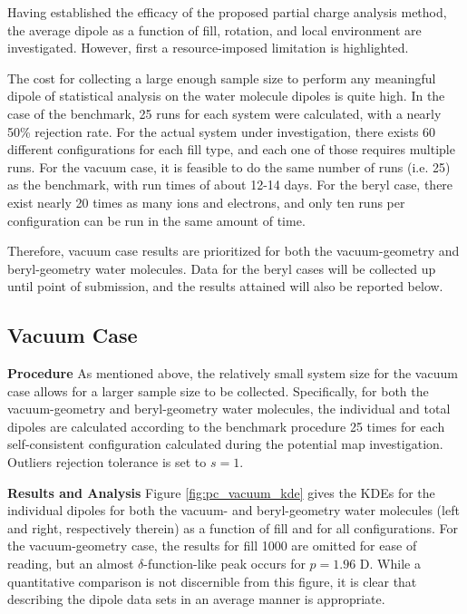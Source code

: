     Having established the efficacy of the proposed partial charge analysis method, the average dipole as a function of fill, rotation, and local environment are investigated. However, first a resource-imposed limitation is highlighted.
    
    The cost for collecting a large enough sample size to perform any meaningful dipole of statistical analysis on the water molecule dipoles is quite high. In the case of the benchmark, 25 runs for each system were calculated, with a nearly 50\% rejection rate. For the actual system under investigation, there exists 60 different configurations for each fill type, and each one of those requires multiple runs. For the vacuum case, it is feasible to do the same number of runs (i.e. 25) as the benchmark, with run times of about 12-14 days. For the beryl case, there exist nearly 20 times as many ions and electrons, and only ten runs per configuration can be run in the same amount of time. 
    
    Therefore, vacuum case results are prioritized for both the vacuum-geometry and beryl-geometry water molecules. Data for the beryl cases will be collected up until point of submission, and the results attained will also be reported below.
    
        \subsection{Vacuum Case}
        \label{sec:pc_vacuum_Case}
        
        \textbf{Procedure} As mentioned above, the relatively small system size for the vacuum case allows for a larger sample size to be collected. Specifically, for both the vacuum-geometry and beryl-geometry water molecules, the individual and total dipoles are calculated according to the benchmark procedure 25 times for each self-consistent configuration calculated during the potential map investigation. Outliers rejection tolerance is set to $s=1$.
        
        \textbf{Results and Analysis} Figure \ref{fig:pc_vacuum_kde} gives the KDEs for the individual dipoles for both the vacuum- and beryl-geometry water molecules (left and right, respectively therein) as a function of fill and for all configurations. For the vacuum-geometry case, the results for fill 1000 are omitted for ease of reading, but an almost $\delta$-function-like peak occurs for $p = 1.96$ D. While a quantitative comparison is not discernible from this figure, it is clear that describing the dipole data sets in an average manner is appropriate.
        
